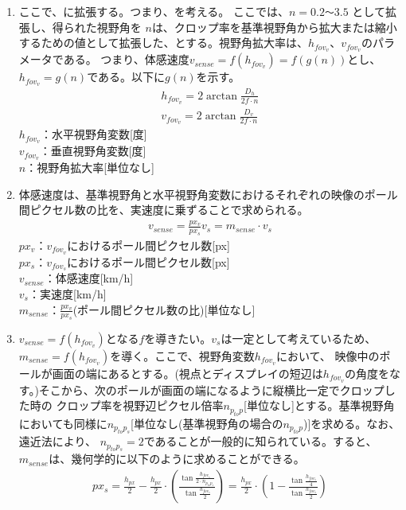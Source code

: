 \begin{enumerate}
  \item ここで、に拡張する。つまり、を考える。
  ここでは、$n = 0.2$\verb|～|$3.5$ として拡張し、得られた視野角を
  $n$は、クロップ率を基準視野角から拡大または縮小するための値として拡張した、とする。視野角拡大率は、$h_{fov_v}$、$v_{fov_v}$のパラメータである。
  つまり、体感速度$v_{sense} = f(h_{fov_v}) = f(g(n))$とし、$h_{fov_v} = g(n)$である。以下に$g(n)$を示す。
  \begin{align}
    h_{fov_v} = 2\arctan{\frac{D_h}{2f\cdot n}}\\
    v_{fov_v} = 2\arctan{\frac{D_v}{2f\cdot n}}
  \end{align}
  $h_{fov_v}$：水平視野角変数[度]\\
  $v_{fov_v}$：垂直視野角変数[度]\\
  $n$：視野角拡大率[単位なし]
  \item 体感速度は、基準視野角と水平視野角変数におけるそれぞれの映像のポール間ピクセル数の比を、実速度に乗ずることで求められる。
  \begin{align}
    v_{sense} = \frac{px_v}{px_s}v_s = m_{sense}\cdot v_s
  \end{align}
  $px_v$：$v_{fov_v}$におけるポール間ピクセル数[px] \\
  $px_s$：$v_{fov_s}$におけるポール間ピクセル数[px] \\
  $v_{sense}$：体感速度[km/h]\\
  $v_s$：実速度[km/h]\\
  $m_{sense}$：$\frac{px_v}{px_s}$(ポール間ピクセル数の比)[単位なし]
  \item $v_{sense} = f(h_{fov_v})$となる$f$を導きたい。$v_s$は一定として考えているため、$m_{sense}=f(h_{fov_v})$を導く。ここで、視野角変数$h_{fov_v}$において、
  映像中のポールが画面の端にあるとする。(視点とディスプレイの短辺は$h_{fov_v}$の角度をなす。)そこから、次のポールが画面の端になるように縦横比一定でクロップした時の
  クロップ率を視野辺ピクセル倍率$n_{p_{to}p}$[単位なし]とする。基準視野角においても同様に$n_{p_{to}p_s}$[単位なし(基準視野角の場合の$n_{p_{to}p}$)]を求める。なお、遠近法により、
  $n_{p_{to}p_s}=2$であることが一般的に知られている。すると、$m_{sense}$は、幾何学的に以下のように求めることができる。
  \begin{align}
    px_s = \frac{h_{px}}{2}-\frac{h_{px}}{2}\cdot \left(\frac{\tan{\frac{h_{fov_s}}{2\cdot n_{p_{to}p_s}}}}{\tan{\frac{h_{fov_s}}{2}}}\right)=\frac{h_{px}}{2}\cdot \left(1-\frac{\tan{\frac{h_{fov_s}}{4}}}{\tan{\frac{h_{fov_s}}{2}}}\right)\\

\end{align}
\end{enumerate}
